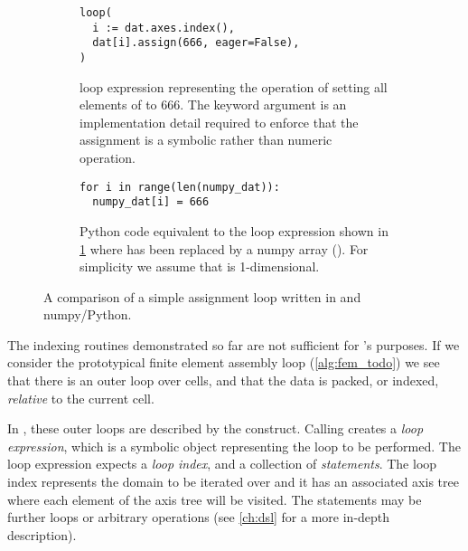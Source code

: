 \documentclass[thesis]{subfiles}
\begin{document}
\begin{figure}[h]
  \centering
  \begin{subfigure}[t]{.48\textwidth}
    \centering
    \begin{verbatim}
loop(
  i := dat.axes.index(),
  dat[i].assign(666, eager=False),
)
    \end{verbatim}
    \caption{
       loop expression representing the operation of setting all elements of  to 666.
      The keyword argument  is an implementation detail required to enforce that the assignment is a symbolic rather than numeric operation.
    }
    \label{fig:simple_loop_pyop3}
  \end{subfigure}
  \hfill
  \begin{subfigure}[t]{.48\textwidth}
    \centering
    \begin{verbatim}
for i in range(len(numpy_dat)):
  numpy_dat[i] = 666

    \end{verbatim}
    \caption{
      Python code equivalent to the loop expression shown in \ref{fig:simple_loop_pyop3} where  has been replaced by a numpy array ().
      For simplicity we assume that  is 1-dimensional.
    }
    \label{fig:simple_loop_python}
  \end{subfigure}

  \caption{A comparison of a simple assignment loop written in  and numpy/Python.}
  \label{fig:simple_loop}
\end{figure}

The indexing routines demonstrated so far are not sufficient for 's purposes.
If we consider the prototypical finite element assembly loop (\cref{alg:fem_todo}) we see that there is an outer loop over cells, and that the data is packed, or indexed, \textit{relative} to the current cell.

In , these outer loops are described by the  construct.
Calling  creates a \textit{loop expression}, which is a symbolic object representing the loop to be performed.
The loop expression expects a \textit{loop index}, and a collection of \textit{statements}.
The loop index represents the domain to be iterated over and it has an associated axis tree where each element of the axis tree will be visited.
The statements may be further loops or arbitrary operations (see \cref{ch:dsl} for a more in-depth description).
\end{document}
